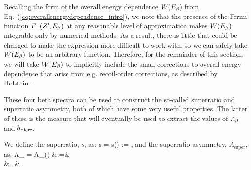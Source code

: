 
Recalling the form of the overall energy dependence $W(E_{\beta})$ from Eq.~(\ref{eq:overallenergydependence_intro}), we note that the presence of the Fermi function $F_{-}(Z^\prime, E_\beta)$ at any reasonable level of approximation makes $W(E_{\beta})$ integrable only by numerical methods.  As a result, there is little that could be changed to make the expression more difficult to work with, so we can safely take $W(E_{\beta})$ to be an arbitrary function.  Therefore, for the remainder of this section, we will take $W(E_{\beta})$ to implicitly include the small corrections to overall energy dependence that arise from e.g.\! recoil-order corrections, as described by Holstein~\cite{holstein}.


These four beta spectra can be used to construct the so-called superratio and superratio asymmetry, both of which have some very useful properties.  The latter of these is the measure that will eventually be used to extract the values of $A_{\beta}$ and $b_{\mathrm{Fierz}}$.   

We define the superratio, $s$, as:
\bea
s \;\;=\;\; s(\Ebeta) \;\;:=\;\;  , 
\eea
and the superratio asymmetry, $A_{\mathrm{super}}$, as:
\bea
A_{} \;\;=\;\; A_{}(\Ebeta) &:=&  
\\
&=& .
\eea
%

